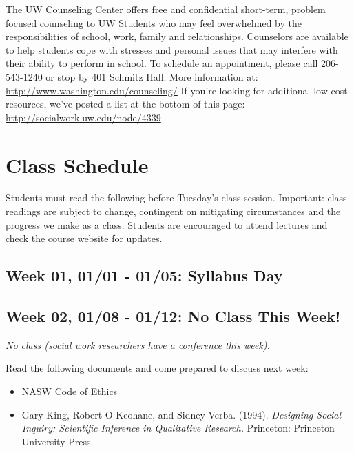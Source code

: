 \documentclass[11pt,]{article}
\providecommand{\tightlist}{%
  \setlength{\itemsep}{0pt}\setlength{\parskip}{0pt}}
\begin{document}
The UW Counseling Center offers free and confidential short-term,
problem focused counseling to UW Students who may feel overwhelmed by
the responsibilities of school, work, family and relationships.
Counselors are available to help students cope with stresses and
personal issues that may interfere with their ability to perform in
school. To schedule an appointment, please call 206-543-1240 or stop by
401 Schmitz Hall. More information at:
\url{http://www.washington.edu/counseling/} If you're looking for
additional low-cost resources, we've posted a list at the bottom of this
page: \url{http://socialwork.uw.edu/node/4339}

\newpage

\section{Class Schedule}\label{class-schedule}

Students must read the following before Tuesday's class session.
Important: class readings are subject to change, contingent on
mitigating circumstances and the progress we make as a class. Students
are encouraged to attend lectures and check the course website for
updates.

\subsection{Week 01, 01/01 - 01/05: Syllabus
Day}\label{week-01-0101---0105-syllabus-day}

\subsection{Week 02, 01/08 - 01/12: No Class This
Week!}\label{week-02-0108---0112-no-class-this-week}

\emph{No class (social work researchers have a conference this week).}

Read the following documents and come prepared to discuss next week:

\begin{itemize}
\tightlist
\item
  \href{https://www.socialworkers.org/About/Ethics/Code-of-Ethics/Code-of-Ethics-English}{NASW
  Code of Ethics}
\item
  Gary King, Robert O Keohane, and Sidney Verba. (1994). \emph{Designing
  Social Inquiry: Scientific Inference in Qualitative Research.}
  Princeton: Princeton University Press.
\end{itemize}
\end{document}
